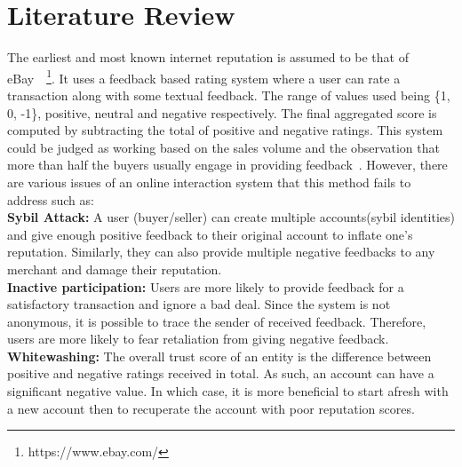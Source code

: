 \chapter{Literature Review}\label{ch:litrev}
The earliest and most known internet reputation is assumed to be that of
eBay~\cite{resnick2002trust}~\footnote{https://www.ebay.com/}. It uses a
feedback based rating system where a user can rate a transaction along with
some textual feedback. The range of values used being \{1, 0, -1\}, positive,
neutral and negative respectively. The final aggregated score is computed by
subtracting the total of positive and negative ratings. This system could be
judged as working based on the sales volume and the observation that more than
half the buyers usually engage in providing feedback~\cite{resnick2006value}. 
However, there are various issues of an online interaction system that this
method fails to address such as: \\
\textbf{Sybil Attack:} A user (buyer/seller) can create multiple accounts(sybil
identities) and give enough positive feedback to their original account to
inflate one's reputation. Similarly, they can also provide multiple negative
feedbacks to any merchant and damage their reputation.\\
\textbf{Inactive participation:} Users are more likely to provide feedback for a
satisfactory transaction and ignore a bad deal. Since the system is not
anonymous, it is possible to trace the sender of received feedback. Therefore,
users are more likely to fear retaliation from giving negative feedback.\\ 
\textbf{Whitewashing:} The overall trust score of an entity is the difference
between positive and negative ratings received in total. As such, an account
can have a significant negative value. In which case, it is more beneficial to
start afresh with a new account then to recuperate the account with poor
reputation scores.\\

